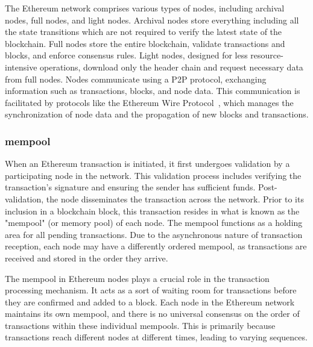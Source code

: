The Ethereum network comprises various types of nodes, including archival nodes, full nodes, and light nodes. Archival nodes store everything including all the state transitions which are not required to verify the latest state of the blockchain. Full nodes store the entire blockchain, validate transactions and blocks, and enforce consensus rules. Light nodes, designed for less resource-intensive operations, download only the header chain and request necessary data from full nodes. Nodes communicate using a P2P protocol, exchanging information such as transactions, blocks, and node data. This communication is facilitated by protocols like the Ethereum Wire Protocol~\cite{ethereumwireprotocol}, which manages the synchronization of node data and the propagation of new blocks and transactions.


\subsubsection{mempool}
When an Ethereum transaction is initiated, it first undergoes validation by a participating node in the network. This validation process includes verifying the transaction's signature and ensuring the sender has sufficient funds. Post-validation, the node disseminates the transaction across the network. Prior to its inclusion in a blockchain block, this transaction resides in what is known as the "mempool" (or memory pool) of each node. The mempool functions as a holding area for all pending transactions. Due to the asynchronous nature of transaction reception, each node may have a differently ordered mempool, as transactions are received and stored in the order they arrive.

The mempool in Ethereum nodes plays a crucial role in the transaction processing mechanism. It acts as a sort of waiting room for transactions before they are confirmed and added to a block. Each node in the Ethereum network maintains its own mempool, and there is no universal consensus on the order of transactions within these individual mempools. This is primarily because transactions reach different nodes at different times, leading to varying sequences.

